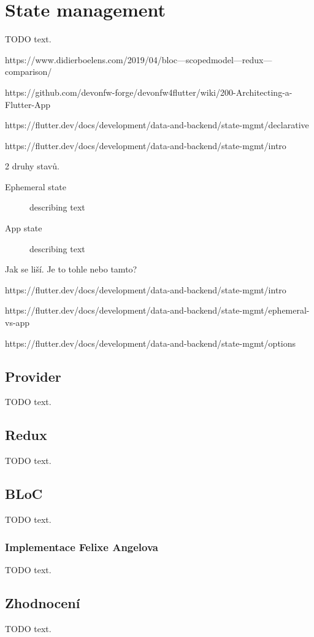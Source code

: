 \section{State management}

TODO text.

https://www.didierboelens.com/2019/04/bloc---scopedmodel---redux---comparison/

https://github.com/devonfw-forge/devonfw4flutter/wiki/200-Architecting-a-Flutter-App

https://flutter.dev/docs/development/data-and-backend/state-mgmt/declarative

https://flutter.dev/docs/development/data-and-backend/state-mgmt/intro


2 druhy stavů.

\begin{description}
    \item[Ephemeral state] describing text
    \item[App state] describing text
\end{description}

Jak se liší. Je to tohle nebo tamto? 

https://flutter.dev/docs/development/data-and-backend/state-mgmt/intro

https://flutter.dev/docs/development/data-and-backend/state-mgmt/ephemeral-vs-app

https://flutter.dev/docs/development/data-and-backend/state-mgmt/options

\subsection{Provider}

TODO text.

\subsection{Redux}

TODO text.

\subsection{BLoC}

TODO text.


\subsubsection{Implementace Felixe Angelova}

TODO text.

\subsection{Zhodnocení}

TODO text.
